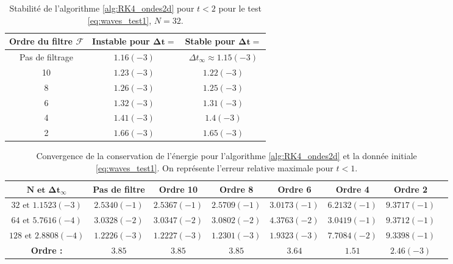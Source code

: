 \begin{table}[htbp]
\begin{center}
\begin{tabular}{|c||c|c|}
\hline
\textbf{Ordre du filtre} $\mathbf{\mathcal{F}}$  & \textbf{Instable pour} $\mathbf{\Delta t =}$ & \textbf{Stable pour} $\mathbf{\Delta t =}$ \\
\hline
\hline
Pas de filtrage & $1.16(-3)$ & $\Delta t_{\infty} \approx 1.15(-3)$\\
10 & $1.23(-3)$ & $1.22(-3)$ \\
8 & $1.26(-3)$ & $1.25(-3)$ \\
6 & $1.32(-3)$ & $1.31(-3)$ \\
4 & $1.41(-3)$ & $1.4(-3)$ \\
2 & $1.66(-3)$ & $1.65(-3)$ \\
\hline
\end{tabular}
\end{center}
\caption{Stabilité de l'algorithme \ref{alg:RK4_ondes2d} pour $t<2$ pour le test \eqref{eq:waves_test1}, $N=32$.}
\label{tab:dt_critique_waves}
\end{table} 


\begin{table}[htbp]
\begin{center}
\begin{tabular}{|c||c|c|c|c|c|c|c|}
\hline
$\mathbf{N \text{ et } \Delta t _{\infty}}$ & \textbf{Pas de filtre} & \textbf{Ordre 10} & \textbf{Ordre 8} & \textbf{Ordre 6} & \textbf{Ordre 4} & \textbf{Ordre 2}\\
\hline
$32\text{ et }1.1523(-3)$ & $2.5340(-1)$ & $2.5367(-1)$ & $2.5709(-1)$ & $3.0173(-1)$ & $6.2132(-1)$ & $9.3717(-1)$ \\
\hline
$64\text{ et }5.7616(-4)$ & $3.0328(-2)$ & $3.0347(-2)$ & $3.0802(-2)$ & $4.3763(-2)$ & $3.0419(-1)$ & $9.3712(-1)$ \\
\hline
$128\text{ et }2.8808(-4)$& $1.2226(-3)$ & $1.2227(-3)$ & $1.2301(-3)$ & $1.9323(-3)$ & $7.7084(-2)$ & $9.3398(-1)$ \\
\hline
\hline
\textbf{Ordre :} & $3.85$ & $3.85$ & $3.85$ & $3.64$ & $1.51$ & $2.46(-3)$ \\
\hline 
\end{tabular}
\end{center}
\caption{Convergence de la conservation de l'énergie pour l'algorithme \ref{alg:RK4_ondes2d} et la donnée initiale \eqref{eq:waves_test1}. On représente l'erreur relative maximale pour $t<1$.}
\label{tab:conservation_waves}
\end{table} 






























